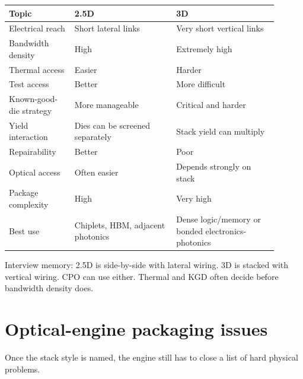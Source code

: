 \begin{center}
\footnotesize
\begin{tabular}{@{}p{0.22\linewidth}p{0.34\linewidth}p{0.34\linewidth}@{}}
\toprule
Topic & 2.5D & 3D \\
\midrule
Electrical reach & Short lateral links & Very short vertical links \\
Bandwidth density & High & Extremely high \\
Thermal access & Easier & Harder \\
Test access & Better & More difficult \\
Known-good-die strategy & More manageable & Critical and harder \\
Yield interaction & Dies can be screened separately & Stack yield can multiply \\
Repairability & Better & Poor \\
Optical access & Often easier & Depends strongly on stack \\
Package complexity & High & Very high \\
Best use & Chiplets, HBM, adjacent photonics & Dense logic/memory or bonded
electronics-photonics \\
\bottomrule
\end{tabular}
\end{center}

{\raggedright\footnotesize Interview memory: 2.5D is side-by-side with lateral
wiring. 3D is stacked with vertical wiring. CPO can use either. Thermal and
KGD often decide before bandwidth density does.\par}

\section{Optical-engine packaging issues}
\label{sec:pkg-engine-issues}

Once the stack style is named, the engine still has to close a list of hard
physical problems.

